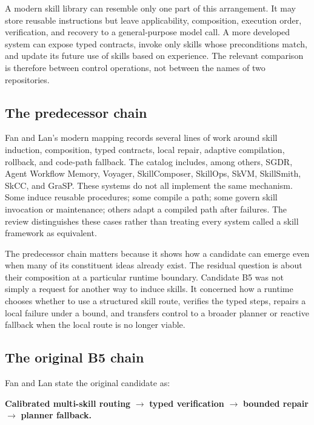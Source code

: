 A modern skill library can resemble only one part of this arrangement. It may store reusable instructions but leave applicability, composition, execution order, verification, and recovery to a general-purpose model call. A more developed system can expose typed contracts, invoke only skills whose preconditions match, and update its future use of skills based on experience. The relevant comparison is therefore between control operations, not between the names of two repositories.

\subsection{The predecessor chain}

Fan and Lan's modern mapping records several lines of work around skill induction, composition, typed contracts, local repair, adaptive compilation, rollback, and code-path fallback. The catalog includes, among others, SGDR, Agent Workflow Memory, Voyager, SkillComposer, SkillOps, SkVM, SkillSmith, SkCC, and GraSP. These systems do not all implement the same mechanism. Some induce reusable procedures; some compile a path; some govern skill invocation or maintenance; others adapt a compiled path after failures. The review distinguishes these cases rather than treating every system called a skill framework as equivalent.

The predecessor chain matters because it shows how a candidate can emerge even when many of its constituent ideas already exist. The residual question is about their composition at a particular runtime boundary. Candidate B5 was not simply a request for another way to induce skills. It concerned how a runtime chooses whether to use a structured skill route, verifies the typed steps, repairs a local failure under a bound, and transfers control to a broader planner or reactive fallback when the local route is no longer viable.

\subsection{The original B5 chain}

Fan and Lan state the original candidate as:

\begin{center}
\textbf{Calibrated multi-skill routing}
\(\longrightarrow\) \textbf{typed verification}
\(\longrightarrow\) \textbf{bounded repair}
\(\longrightarrow\) \textbf{planner fallback.}
\end{center}

